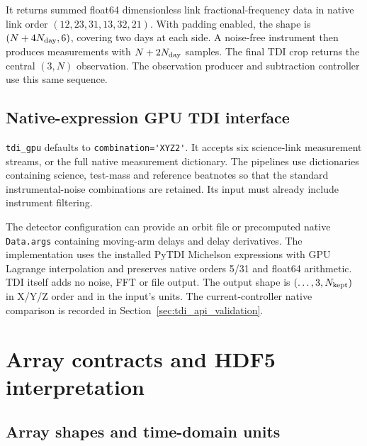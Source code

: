 \documentclass[11pt,a4paper]{article}
\newcommand{\code}[1]{\texttt{\nolinkurl{#1}}}
\begin{document}
It returns summed float64 dimensionless link fractional-frequency data in
native link order \((12,23,31,13,32,21)\). With padding enabled, the shape is
\((N+4N_{\rm day},6)\), covering two days at each side. A noise-free instrument
then produces measurements with \(N+2N_{\rm day}\) samples. The final TDI crop
returns the central \((3,N)\) observation. The observation producer and
subtraction controller use this same sequence.

\subsection{Native-expression GPU TDI interface}
\label{sec:tdi_gpu_api}

\code{tdi_gpu} defaults to \code{combination='XYZ2'}. It accepts six science-link
measurement streams, or the full native measurement dictionary. The pipelines
use dictionaries containing science, test-mass and reference beatnotes so that
the standard instrumental-noise combinations are retained. Its input must
already include instrument filtering.

The detector configuration can provide an orbit file or precomputed native
\code{Data.args} containing moving-arm delays and delay derivatives. The
implementation uses the installed PyTDI Michelson expressions with GPU
Lagrange interpolation and preserves native orders 5/31 and float64 arithmetic.
TDI itself adds no noise, FFT or file output. The output shape is
\((\ldots,3,N_{\rm kept})\) in X/Y/Z order and in the input's units.
The current-controller native comparison is recorded in
Section~\ref{sec:tdi_api_validation}.

\section{Array contracts and HDF5 interpretation}
\label{sec:schema}

\subsection{Array shapes and time-domain units}
\end{document}
